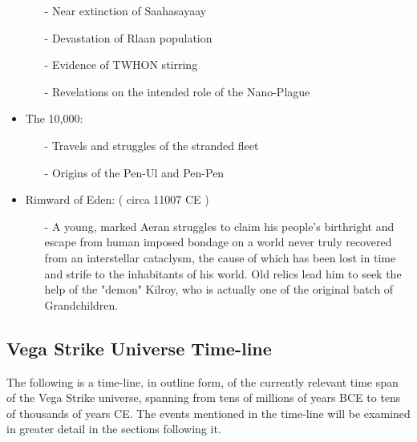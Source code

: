 \begin{itemize}
\begin{itemize}
\item	[-] Near extinction of Saahasayaay
\item	[-] Devastation of Rlaan population
\item	[-] Evidence of TWHON stirring
\item	[-] Revelations on the intended role of the Nano-Plague
\end{itemize}
\item	The 10,000:
\begin{itemize}
\item	[-] Travels and struggles of the stranded fleet
\item	[-] Origins of the Pen-Ul and Pen-Pen
\end{itemize}
\item	Rimward of Eden: ( circa 11007 CE )
\begin{itemize}
\item [-] A young, marked Aeran struggles to claim his people's
birthright and escape from human imposed bondage on a world never
truly recovered from an interstellar cataclysm, the cause of which has
been lost in time and strife to the inhabitants of his world. Old
relics lead him to seek the help of the "demon" Kilroy, who is
actually one of the original batch of Grandchildren.
\end{itemize}
\end{itemize}

\subsection{Vega Strike Universe Time-line}
\label{TimelineOutline}
The following is a time-line, in outline form, of the currently
relevant time span of the Vega Strike universe, spanning from tens of
millions of years BCE to tens of thousands of years CE. The events
mentioned in the time-line will be examined in greater detail in the
sections following it.

